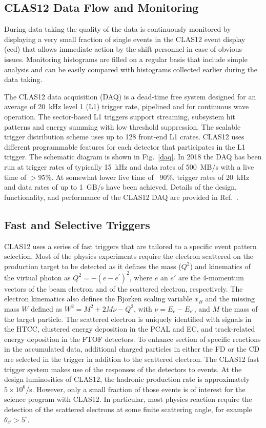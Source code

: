 \documentclass[final,3p,times,twocolumn,authoryear]{elsarticle}
\begin{document}
\subsection{CLAS12 Data Flow and Monitoring} 

During data taking the quality of the data is continuously monitored by displaying a very small fraction of single events
in the CLAS12 event display (ced) that allows immediate action by the shift personnel in case of obvious issues.
Monitoring histograms are filled on a regular basis that include simple analysis and can be easily compared with
histograms collected earlier during the data taking.  

The CLAS12 data acquisition (DAQ) is a dead-time free system designed for an average of 20~kHz level 1 (L1) 
trigger rate, pipelined and for continuous wave operation. The sector-based  L1 triggers support streaming, subsystem 
hit patterns and energy summing with low threshold suppression.  The scalable trigger distribution scheme uses up to
128 front-end L1 crates. CLAS12 uses different programmable features for each detector that participates in the L1
trigger. The schematic diagram is shown in Fig.~\ref{daq}. In 2018 the DAQ has been run at trigger rates of typically
15~kHz and data rates of 500~MB/s with a live time of $> 95\%$. At somewhat lower live time of ~90\%, trigger rates
of 20~kHz and data rates of up to 1~GB/s have been achieved. Details of the design, functionality, and performance of
the CLAS12 DAQ are provided in  Ref.~\cite{DAQ}. 

\subsection{Fast and Selective Triggers} 

CLAS12 uses a series of fast triggers that are tailored to a specific event pattern selection. Most of the physics
experiments require the electron scattered on the production target to be detected as it defines the mass ($Q^2$)
and kinematics of the virtual photon as $Q^2 = -(e - e^\prime)^2$, where $e$ an $e'$ are the 4-momentum vectors
of the beam electron and of the scattered electron, respectively. The electron kinematics also defines the Bjorken
scaling variable $x_B$  and the missing mass $W$ defined as $W^2 = M^2 + 2M\nu - Q^2$, with $\nu = E_e - E_{e'}$,
and $M$ the mass of the target particle. The scattered electron is uniquely identified with signals in the HTCC, clustered
energy deposition  in the PCAL and EC, and track-related energy deposition in the FTOF detectors. To enhance section of
specific reactions in the accumulated data, additional charged particles in either the FD or the CD are selected in the
trigger in addition to the scattered electron. The CLAS12 fast trigger system makes use of the responses of the detectors
to events. At the design luminosities of CLAS12, the hadronic production rate is approximately $5 \times 10^6$/s. However,
only a small fraction of those events is of interest for the science program with CLAS12. In particular, most physics reaction
require the detection of the scattered electrons at some finite scattering angle, for example $\theta_{e'} > 5^\circ$.  
   
\end{document}
